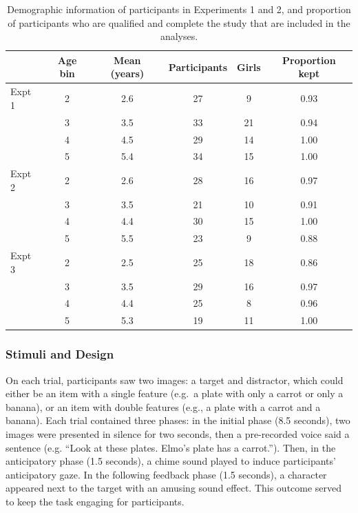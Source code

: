 \documentclass[a4paper,man,apacite,floatsintext]{apa6}
\begin{document}
\begin{table}[tb]
\centering
\begin{tabular}{lccccc}
  & Age bin & Mean (years) & Participants & Girls & Proportion kept \\ 
  \hline
Expt 1 & 2 & 2.6 & 27 & 9 & 0.93 \\ 
    & 3 & 3.5 & 33 & 21 & 0.94 \\ 
    & 4 & 4.5 & 29 & 14 & 1.00 \\ 
    & 5 & 5.4 & 34 & 15 & 1.00 \\ 
  Expt 2 & 2 & 2.6 & 28 & 16 & 0.97 \\ 
    & 3 & 3.5 & 21 & 10 & 0.91 \\ 
    & 4 & 4.4 & 30 & 15 & 1.00 \\ 
    & 5 & 5.5 & 23 & 9 & 0.88 \\ 
  Expt 3 & 2 & 2.5 & 25 & 18 & 0.86 \\ 
    & 3 & 3.5 & 29 & 16 & 0.97 \\ 
    & 4 & 4.4 & 25 & 8 & 0.96 \\ 
    & 5 & 5.3 & 19 & 11 & 1.00 \\ 
   \hline
\end{tabular}
\caption{Demographic information of participants in Experiments 1 and 2, and proportion of participants who are qualified and complete the study that are included in the analyses.} 
\label{tab:exp1_summary}
\end{table}

\subsubsection{Stimuli and Design}\label{stimuli-and-design}

On each trial, participants saw two images: a target and distractor,
which could either be an item with a single feature (e.g.~a plate with
only a carrot or only a banana), or an item with double features (e.g.,
a plate with a carrot and a banana). Each trial contained three phases:
in the initial phase (8.5 seconds), two images were presented in silence
for two seconds, then a pre-recorded voice said a sentence (e.g. ``Look
at these plates. Elmo's plate has a carrot.''). Then, in the
anticipatory phase (1.5 seconds), a chime sound played to induce
participants' anticipatory gaze. In the following feedback phase (1.5
seconds), a character appeared next to the target with an amusing sound
effect. This outcome served to keep the task engaging for participants.
\end{document}

